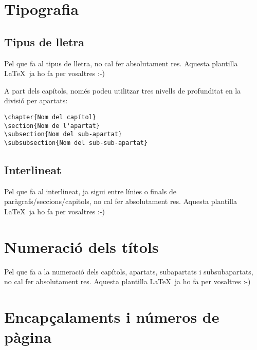 \section{Tipografia}

\subsection{Tipus de lletra}

Pel que fa al tipus de lletra, no cal fer absolutament res. Aquesta plantilla \LaTeX \ ja ho fa per vosaltres :-)

A part dels capítols, només podeu utilitzar tres nivells de profunditat en la divisió per apartats:

\begin{verbatim}
\chapter{Nom del capítol}
\section{Nom de l'apartat}
\subsection{Nom del sub-apartat}
\subsubsection{Nom del sub-sub-apartat}
\end{verbatim}



\subsection{Interlineat}

Pel que fa al interlineat, ja sigui entre línies o finals de paràgrafs/seccions/capitols, no cal fer absolutament res. Aquesta plantilla \LaTeX \ ja ho fa per vosaltres :-)


\section{Numeració dels títols}

Pel que fa a la numeració dels capítols, apartats, subapartats i subsubapartats, no cal fer absolutament res. Aquesta plantilla \LaTeX \ ja ho fa per vosaltres :-)


\section{Encapçalaments i números de pàgina}


